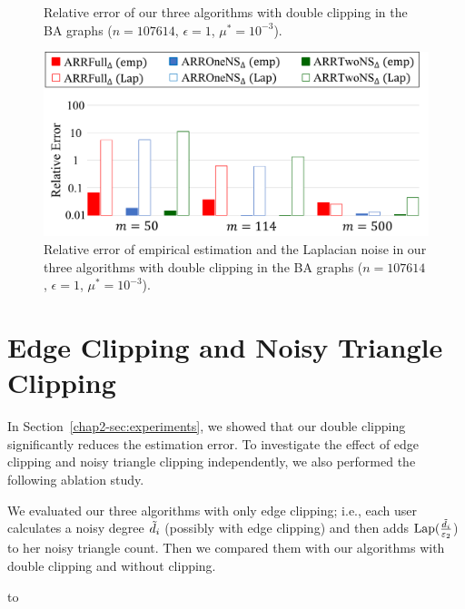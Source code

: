 {\begin{figure}[t]
  \caption{Relative error of our three algorithms with double clipping in the BA graphs ($n=107614$, $\epsilon=1$, $\mu^* = 10^{-3}$).}
  \label{chap2-fig:resA_BAGraph}
\vspace{5mm}
  \centering
  \includegraphics[width=0.95\linewidth]{fig/resA_BAGraph_emp_Lap.pdf}
  
  \caption{Relative error of empirical estimation and the Laplacian noise in our three algorithms with double clipping in the BA graphs ($n=107614$, $\epsilon=1$, $\mu^* = 10^{-3}$).}
  \label{chap2-fig:resA_BAGraph_emp_Lap}
\end{figure}

\section{Edge Clipping and Noisy Triangle Clipping}
\label{chap2-sec:EC_DC}
In Section~\ref{chap2-sec:experiments}, we showed that our double clipping significantly reduces the estimation error.
To investigate the effect of
edge clipping and noisy triangle clipping independently, we also performed the following ablation study.

We evaluated our three algorithms with only
edge clipping; i.e., each user calculates a noisy degree $\tilde{d}_i$ (possibly with edge clipping) and then adds $\textrm{Lap}(\frac{\tilde{d}_i}{\varepsilon_2}$) to her noisy triangle count.
Then we compared them with our algorithms with double clipping and without clipping.

\begin{table}[t]
\caption{\#$4$-cycles $C_4$ in each graph dataset.}
\centering
\hbox to
\label{chap2-tab:resA_4cycles}
\end{table}

}

